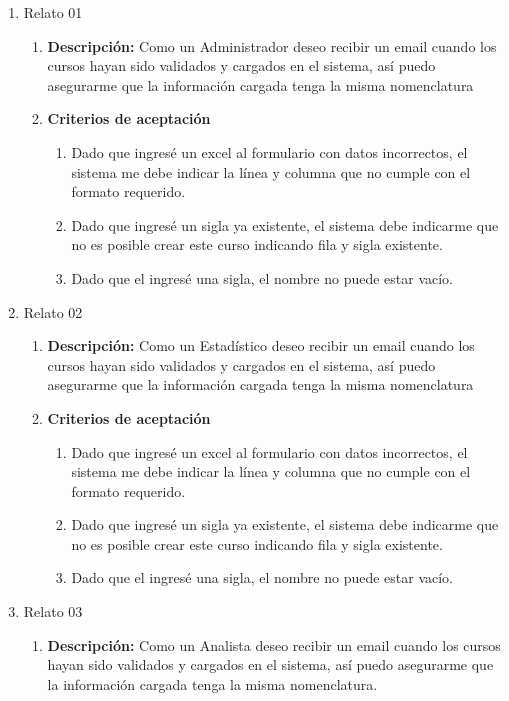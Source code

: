 \begin{enumerate}
	\item Relato 01
		\begin{enumerate}
			\item \textbf{Descripción:} Como un Administrador deseo recibir un email cuando los cursos hayan sido validados y cargados en el sistema, así puedo asegurarme que la información cargada tenga la misma nomenclatura
			\item \textbf{Criterios de aceptación}
				\begin{enumerate}
					\item Dado que ingresé un excel al formulario con datos incorrectos, el sistema me debe indicar la línea y columna que no cumple con el formato requerido.
					\item Dado que ingresé un sigla ya existente, el sistema debe indicarme que no es posible crear este curso indicando fila y sigla existente.
					\item Dado que el ingresé una sigla, el nombre no puede estar vacío.
				\end{enumerate}
		\end{enumerate}
	\item Relato 02
		\begin{enumerate}
			\item \textbf{Descripción:} Como un Estadístico deseo recibir un email cuando los cursos hayan sido validados y cargados en el sistema, así puedo asegurarme que la información cargada tenga la misma nomenclatura
			\item \textbf{Criterios de aceptación}
				\begin{enumerate}
					\item Dado que ingresé un excel al formulario con datos incorrectos, el sistema me debe indicar la línea y columna que no cumple con el formato requerido.
					\item Dado que ingresé un sigla ya existente, el sistema debe indicarme que no es posible crear este curso indicando fila y sigla existente.
					\item Dado que el ingresé una sigla, el nombre no puede estar vacío.
				\end{enumerate}
		\end{enumerate}
	\item Relato 03
		\begin{enumerate}
			\item \textbf{Descripción:} Como un Analista deseo recibir un email cuando los cursos hayan sido validados y cargados en el sistema, así puedo asegurarme que la información cargada tenga la misma nomenclatura.

\end{enumerate}
\end{enumerate}
